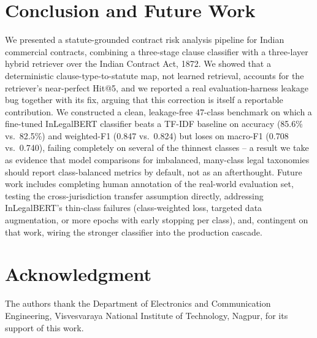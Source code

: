 \documentclass[conference]{IEEEtran}
\begin{document}
\section{Conclusion and Future Work}
\label{sec:conclusion}

We presented a statute-grounded contract risk analysis pipeline for Indian commercial contracts, combining a three-stage clause classifier with a three-layer hybrid retriever over the Indian Contract Act, 1872. We showed that a deterministic clause-type-to-statute map, not learned retrieval, accounts for the retriever's near-perfect Hit@5, and we reported a real evaluation-harness leakage bug together with its fix, arguing that this correction is itself a reportable contribution. We constructed a clean, leakage-free 47-class benchmark on which a fine-tuned InLegalBERT classifier beats a TF-IDF baseline on accuracy (85.6\% vs.\ 82.5\%) and weighted-F1 (0.847 vs.\ 0.824) but loses on macro-F1 (0.708 vs.\ 0.740), failing completely on several of the thinnest classes -- a result we take as evidence that model comparisons for imbalanced, many-class legal taxonomies should report class-balanced metrics by default, not as an afterthought. Future work includes completing human annotation of the real-world evaluation set, testing the cross-jurisdiction transfer assumption directly, addressing InLegalBERT's thin-class failures (class-weighted loss, targeted data augmentation, or more epochs with early stopping per class), and, contingent on that work, wiring the stronger classifier into the production cascade.

\section*{Acknowledgment}
The authors thank the Department of Electronics and Communication Engineering, Visvesvaraya National Institute of Technology, Nagpur, for its support of this work.



\end{document}
